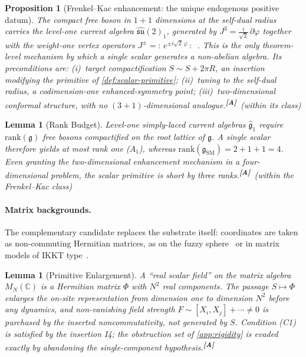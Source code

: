 \documentclass[12pt,a4paper,twoside]{article}
\theoremstyle{plain}
\newtheorem{proposition}[theorem]{Proposition}
\newtheorem{lemma}[theorem]{Lemma}
\theoremstyle{definition}
\theoremstyle{remark}
\newcommand{\catmark}[1]{\textsuperscript{\textsf{\textbf{[#1]}}}}
\begin{document}
\begin{proposition}[Frenkel--Kac enhancement: the unique endogenous positive datum]
\label{prop:frenkel-kac}
The compact free boson in $1{+}1$ dimensions at the self-dual radius
carries the level-one current algebra $\widehat{\mathfrak{su}}(2)_1$,
generated by $J^3=\tfrac{i}{\sqrt{2}}\,\partial\varphi$ together with the
weight-one vertex operators
$J^{\pm}={:}\,e^{\pm i\sqrt{2}\,\varphi}\,{:}$~\cite{frenkelkac1980,goddardolive1986}.
This is the only theorem-level mechanism by which a \emph{single} scalar
generates a non-abelian algebra. Its preconditions are: (i)~target
compactification $S\sim S+2\pi R$, an insertion modifying the primitive of
\cref{def:scalar-primitive}; (ii)~tuning to the self-dual radius, a
codimension-one enhanced-symmetry point; (iii)~two-dimensional conformal
structure, with no $(3{+}1)$-dimensional analogue.\catmark{A}\ (within its
class)
\end{proposition}

\begin{lemma}[Rank Budget]
\label{lem:rank-budget}
Level-one simply-laced current algebras $\widehat{\mathfrak{g}}_1$ require
$\mathrm{rank}(\mathfrak{g})$ free bosons compactified on the root lattice
of $\mathfrak{g}$. A single scalar therefore yields at most rank one
($A_1$), whereas
$\mathrm{rank}(\mathfrak{g}_{\mathrm{SM}})=2+1+1=4$. Even granting the
two-dimensional enhancement mechanism in a four-dimensional problem, the
scalar primitive is short by three ranks.\catmark{A}\ (within the
Frenkel--Kac class)
\end{lemma}

\paragraph{Matrix backgrounds.}
The complementary candidate replaces the substrate itself: coordinates are
taken as non-commuting Hermitian matrices, as on the fuzzy
sphere~\cite{madore1992} or in matrix models of IKKT
type~\cite{ikkt1997}.

\begin{lemma}[Primitive Enlargement]
\label{lem:primitive-enlargement}
A ``real scalar field'' on the matrix algebra $M_N(\mathbb{C})$ is a
Hermitian matrix $\Phi$ with $N^2$ real components. The passage
$S\mapsto\Phi$ enlarges the on-site representation from dimension one to
dimension $N^2$ before any dynamics, and non-vanishing field strength
$F\sim[X_i,X_j]+\cdots\neq 0$ is purchased by the inserted
noncommutativity, not generated by $S$. Condition (C1) is satisfied by the
insertion I4; the obstruction set of \cref{app:rigidity} is evaded exactly
by abandoning the single-component hypothesis.\catmark{A}
\end{lemma}
\end{document}
